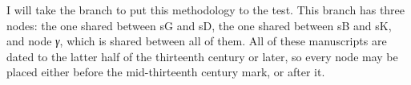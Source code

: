 
I will take the branch 
to put this methodology to the test. This branch has three nodes: the one shared between \gls{sG} and \gls{sD}, the one shared between \gls{sB} and \gls{sK}, and node \textit{γ}, which is shared between all of them. All of these manuscripts are dated to the latter half of the thirteenth century or later, so every node may be placed either before the mid-thirteenth century mark, or after it.

